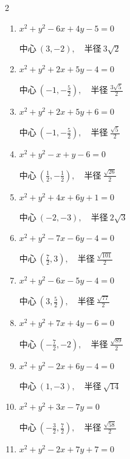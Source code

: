 \begin{multicols}{2}
\begin{enumerate}
  \item $x^{2}+y^{2}-6x+4y-5=0$

        $\displaystyle 中心\: \left(3,-2\right), \quad 半径 \ 3\sqrt{2}$

  \item $x^{2}+y^{2}+2x+5y-4=0$

        $\displaystyle 中心\: \left(-1,-\frac{5}{2}\right), \quad 半径 \ \frac{3\sqrt{5}}{2}$

  \item $x^{2}+y^{2}+2x+5y+6=0$

        $\displaystyle 中心\: \left(-1,-\frac{5}{2}\right), \quad 半径 \ \frac{\sqrt{5}}{2}$

  \item $x^{2}+y^{2}-x+y-6=0$

        $\displaystyle 中心\: \left(\frac{1}{2},-\frac{1}{2}\right), \quad 半径 \ \frac{\sqrt{26}}{2}$

  \item $x^{2}+y^{2}+4x+6y+1=0$

        $\displaystyle 中心\: \left(-2,-3\right), \quad 半径 \ 2\sqrt{3}$

  \item $x^{2}+y^{2}-7x-6y-4=0$

        $\displaystyle 中心\: \left(\frac{7}{2},3\right), \quad 半径 \ \frac{\sqrt{101}}{2}$

  \item $x^{2}+y^{2}-6x-5y-4=0$

        $\displaystyle 中心\: \left(3,\frac{5}{2}\right), \quad 半径 \ \frac{\sqrt{77}}{2}$

  \item $x^{2}+y^{2}+7x+4y-6=0$

        $\displaystyle 中心\: \left(-\frac{7}{2},-2\right), \quad 半径 \ \frac{\sqrt{89}}{2}$

\columnbreak %

  \item $x^{2}+y^{2}-2x+6y-4=0$

        $\displaystyle 中心\: \left(1,-3\right), \quad 半径 \ \sqrt{14}$

  \item $x^{2}+y^{2}+3x-7y=0$

        $\displaystyle 中心\: \left(-\frac{3}{2},\frac{7}{2}\right), \quad 半径 \ \frac{\sqrt{58}}{2}$

  \item $x^{2}+y^{2}-2x+7y+7=0$


\end{enumerate}
\end{multicols}
